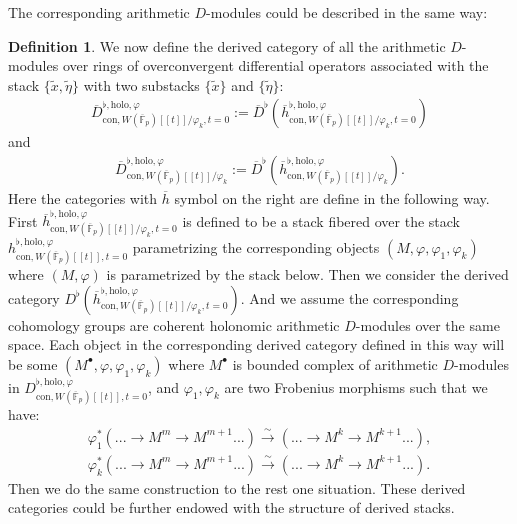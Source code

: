 \documentclass[11pt]{book}
\theoremstyle{definition}
\newtheorem{definition}[theorem]{Definition}
\numberwithin{equation}{section}
\begin{document}
\indent The corresponding arithmetic $D$-modules could be described in the same way:


\begin{definition}
We now define the derived category of all the arithmetic $D$-modules over rings of overconvergent differential operators associated with the stack $\{\widetilde{x},\widetilde{\eta}\}$ with two substacks $\{\widetilde{x}\}$ and $\{\widetilde{\eta}\}$:
\begin{align}
\overline{D}^{\flat,\mathrm{holo},\varphi}_{\mathrm{con},W(\overline{\mathbb{F}}_p)[[t]]/\varphi_k,t=0}:=\overline{D}^\flat(\overline{h}^{\flat,\mathrm{holo},\varphi}_{\mathrm{con},W(\overline{\mathbb{F}}_p)[[t]]/\varphi_k,t=0})	
\end{align}
and 
\begin{align}
\overline{D}^{\flat,\mathrm{holo},\varphi}_{\mathrm{con},W(\overline{\mathbb{F}}_p)[[t]]/\varphi_k}:=\overline{D}^\flat(\overline{h}^{\flat,\mathrm{holo},\varphi}_{\mathrm{con},W(\overline{\mathbb{F}}_p)[[t]]/\varphi_k}).
\end{align}
Here the categories with $\overline{h}$ symbol on the right are define in the following way. First $\overline{h}^{\flat,\mathrm{holo},\varphi}_{\mathrm{con},W(\overline{\mathbb{F}}_p)[[t]]/\varphi_k,t=0}$ is defined to be a stack fibered over the stack $h^{\flat,\mathrm{holo},\varphi}_{\mathrm{con},W(\overline{\mathbb{F}}_p)[[t]],t=0}$ parametrizing the corresponding objects $(M,\varphi,\varphi_{1},\varphi_k)$ where $(M,\varphi)$ is parametrized by the stack below. Then we consider the derived category $D^\flat(\overline{h}^{\flat,\mathrm{holo},\varphi}_{\mathrm{con},W(\overline{\mathbb{F}}_p)[[t]]/\varphi_k,t=0})$. And we assume the corresponding cohomology groups are coherent holonomic arithmetic $D$-modules over the same space. Each object in the corresponding derived category defined in this way will be some $(M^\bullet,\varphi,\varphi_{1},\varphi_k)$ where $M^\bullet$ is bounded complex of arithmetic $D$-modules in $D^{\flat,\mathrm{holo},\varphi}_{\mathrm{con},W(\overline{\mathbb{F}}_p)[[t]],t=0}$, and $\varphi_{1},\varphi_k$ are two Frobenius morphisms such that we have:
\begin{align}
\varphi_1^*(...\rightarrow M^m \rightarrow M^{m+1}...)\overset{\sim}{\longrightarrow} (...\rightarrow M^k \rightarrow M^{k+1}...),\\
\varphi_k^*(...\rightarrow M^m \rightarrow M^{m+1}...)\overset{\sim}{\longrightarrow} (...\rightarrow M^k \rightarrow M^{k+1}...).	
\end{align}
Then we do the same construction to the rest one situation. These derived categories could be further endowed with the structure of derived stacks.
\end{definition}
\end{document}
